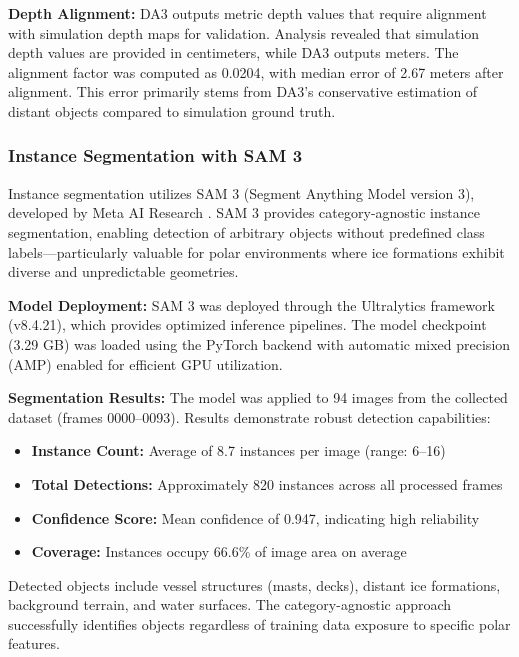 \textbf{Depth Alignment:} DA3 outputs metric depth values that require alignment with simulation depth maps for validation. Analysis revealed that simulation depth values are provided in centimeters, while DA3 outputs meters. The alignment factor was computed as 0.0204, with median error of 2.67 meters after alignment. This error primarily stems from DA3's conservative estimation of distant objects compared to simulation ground truth.

\subsubsection{Instance Segmentation with SAM 3}

Instance segmentation utilizes SAM 3 (Segment Anything Model version 3), developed by Meta AI Research \parencite{sam32026}. SAM 3 provides category-agnostic instance segmentation, enabling detection of arbitrary objects without predefined class labels---particularly valuable for polar environments where ice formations exhibit diverse and unpredictable geometries.

\textbf{Model Deployment:} SAM 3 was deployed through the Ultralytics framework (v8.4.21), which provides optimized inference pipelines. The model checkpoint (3.29 GB) was loaded using the PyTorch backend with automatic mixed precision (AMP) enabled for efficient GPU utilization.

\textbf{Segmentation Results:} The model was applied to 94 images from the collected dataset (frames 0000--0093). Results demonstrate robust detection capabilities:

\begin{itemize}
    \item \textbf{Instance Count:} Average of 8.7 instances per image (range: 6--16)
    \item \textbf{Total Detections:} Approximately 820 instances across all processed frames
    \item \textbf{Confidence Score:} Mean confidence of 0.947, indicating high reliability
    \item \textbf{Coverage:} Instances occupy 66.6\% of image area on average
\end{itemize}

Detected objects include vessel structures (masts, decks), distant ice formations, background terrain, and water surfaces. The category-agnostic approach successfully identifies objects regardless of training data exposure to specific polar features.

